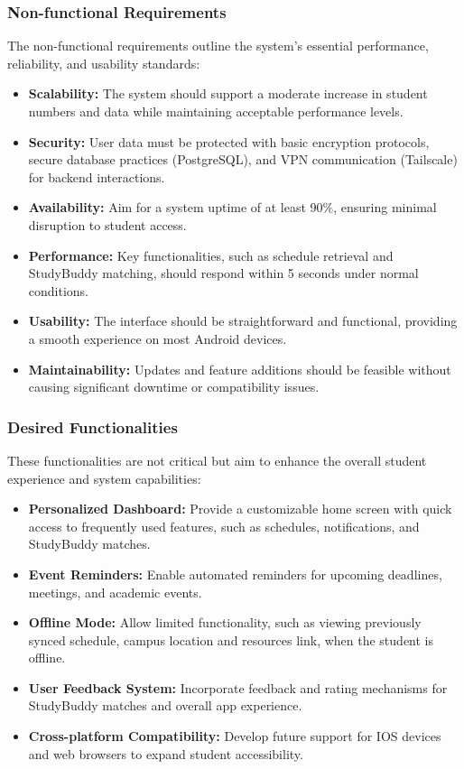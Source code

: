 \documentclass[12pt]{article}
\begin{document}
\pagebreak

\subsubsection{Non-functional Requirements}
The non-functional requirements outline the system's essential performance, reliability, and usability standards:  
\begin{itemize}  
    \item \textbf{Scalability:} The system should support a moderate increase in student numbers and data while maintaining acceptable performance levels.  
    \item \textbf{Security:} User data must be protected with basic encryption protocols, secure database practices (PostgreSQL), and VPN communication (Tailscale) for backend interactions.  
    \item \textbf{Availability:} Aim for a system uptime of at least 90\%, ensuring minimal disruption to student access.  
    \item \textbf{Performance:} Key functionalities, such as schedule retrieval and StudyBuddy matching, should respond within 5 seconds under normal conditions.  
    \item \textbf{Usability:} The interface should be straightforward and functional, providing a smooth experience on most Android devices.  
    \item \textbf{Maintainability:} Updates and feature additions should be feasible without causing significant downtime or compatibility issues.  
\end{itemize}  

\subsubsection{Desired Functionalities}
These functionalities are not critical but aim to enhance the overall student experience and system capabilities:  
\begin{itemize}  
    \item \textbf{Personalized Dashboard:} Provide a customizable home screen with quick access to frequently used features, such as schedules, notifications, and StudyBuddy matches.  
    \item \textbf{Event Reminders:} Enable automated reminders for upcoming deadlines, meetings, and academic events.  
    \item \textbf{Offline Mode:} Allow limited functionality, such as viewing previously synced schedule, campus location and resources link, when the student is offline.  
    \item \textbf{User Feedback System:} Incorporate feedback and rating mechanisms for StudyBuddy matches and overall app experience.  
    \item \textbf{Cross-platform Compatibility:} Develop future support for IOS devices and web browsers to expand student accessibility.  
\end{itemize}  
\end{document}
